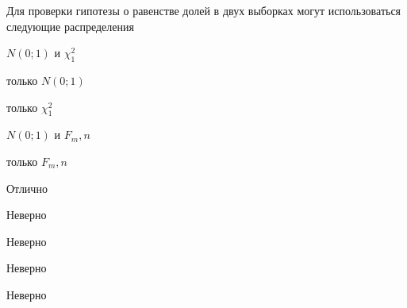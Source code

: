 
\begin{question}
Для проверки гипотезы о равенстве долей в двух выборках могут
использоваться следующие распределения
\begin{answerlist}
  \item \(N(0;1)\) и \(\chi^2_1\)
  \item только \(N(0;1)\)
  \item только \(\chi^2_1\)
  \item \(N(0;1)\) и \(F_m,n\)
  \item только \(F_m,n\)
\end{answerlist}
\end{question}

\begin{solution}
\begin{answerlist}
  \item Отлично
  \item Неверно
  \item Неверно
  \item Неверно
  \item Неверно
\end{answerlist}
\end{solution}

